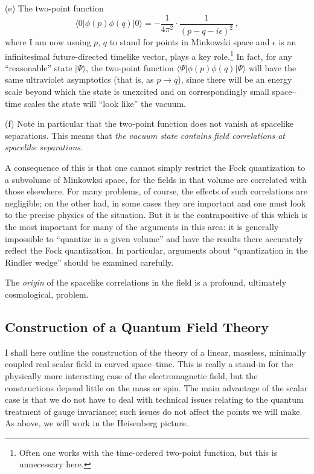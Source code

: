\documentclass[
%
draft    %
,numberedheadings 
,bibliocites
  ]
  {aipproc}
\begin{document}
(e) The two-point function
\begin{equation}\label{twopoint}
\langle 0|\phi (p)\phi (q)|0\rangle =
  -\frac{1}{4\pi ^2}\cdot\frac{1}{(p-q-i\epsilon )^2}
     \, ,
\end{equation}
where I am now usuing $p$, $q$ to stand for points in Minkowski space and $\epsilon$ is an infinitesimal future-directed timelike vector, plays a key role.\footnote{Often one works with the time-ordered two-point function, but this is unnecessary here.} In fact, for any ``reasonable'' state $|\Psi\rangle$, the two-point function $\langle\Psi |\phi (p)\phi (q)|\Psi\rangle$ will have the same ultraviolet asymptotics (that is, as $p\to q$), since there will be an energy scale beyond which the state is unexcited and on correspondingly small space--time scales the state will ``look like'' the vacuum.

(f) Note in particular that the two-point function 
does not vanish at spacelike separations.  This means that {\em the vacuum state contains field correlations at spacelike separations.}



A consequence of this is
that one cannot simply restrict the Fock quantization to a subvolume of Minkowksi space, for the fields in that volume are correlated with those elsewhere.  For many problems, of course, the effects of such correlations are negligible; on the other had, in some cases they are important and one must look to the precise physics of the situation.  
But it is the contrapositive of this which is the most important for many of the arguments in this area:  it is generally impossible to ``quantize in a given volume''  and have the results there accurately reflect the Fock quantization.  In particular, arguments about ``quantization in the Rindler wedge'' should be examined carefully.

The {\em origin} of the spacelike correlations in the field is a profound, ultimately cosmological, problem.



\subsection{Construction of a Quantum Field Theory}

I shall here outline the construction of the theory of a linear, massless, minimally coupled real scalar field in curved space--time. 
This is really a stand-in for the physically more interesting case of the electromagnetic field, but the constructions depend little on the mass or spin.  The main advantage of the scalar case is that we do not have to deal with technical issues relating to the quantum treatment of gauge invariance; such issues do not affect the points we will make.
As above, we will work in the Heisenberg picture.
\end{document}
